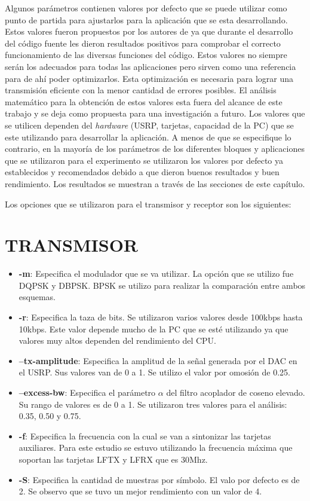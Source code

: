 Algunos par\'ametros contienen valores por defecto que se puede utilizar como punto de partida para ajustarlos para la
aplicaci\'on que se esta desarrollando. Estos valores fueron propuestos por los autores de \gnuradio ya que durante el desarrollo
del c\'odigo fuente les dieron resultados positivos para comprobar el correcto funcionamiento de las diversas funciones del
c\'odigo. Estos valores no siempre ser\'an los adecuados para todas las aplicaciones pero sirven como una referencia para de ah\'i
poder optimizarlos. Esta optimizaci\'on es necesaria para lograr una transmisi\'on eficiente con la menor cantidad de errores
posibles. El an\'alisis matem\'atico para la obtenci\'on de estos valores esta fuera del alcance de este trabajo y se deja como
propuesta para una investigaci\'on a futuro. Los valores que se utilicen dependen del \emph{hardware} (USRP, tarjetas, capacidad
de la PC) que se este utilizando para desarrollar la aplicaci\'on. A menos de que se especifique lo contrario, en la mayor\'ia de
los par\'ametros de los diferentes bloques y aplicaciones que se utilizaron para el experimento se utilizaron los valores por
defecto ya establecidos y recomendados debido a que dieron buenos resultados y buen rendimiento. Los resultados se muestran a
trav\'es de las secciones de este cap\'itulo.

Los opciones que se utilizaron para el transmisor y receptor son los siguientes:

\section*{TRANSMISOR}
\begin{itemize}
  \item \textbf{-m}: Especifica el modulador que se va utilizar. La opci\'on que se utilizo fue
  DQPSK y DBPSK. BPSK se utilizo para realizar la comparaci\'on entre ambos esquemas.
  \item \textbf{-r}: Especifica la taza de bits. Se utilizaron varios valores desde 100kbps hasta
  10kbps. Este valor depende mucho de la PC que se est\'e utilizando ya que valores muy altos
  dependen del rendimiento del CPU.
  \item \textbf{--tx-amplitude}: Especifica la amplitud de la se\~nal generada por el DAC en el
  USRP. Sus valores van de 0 a 1. Se utilizo el valor por omosi\'on de 0.25.
  \item \textbf{--excess-bw}: Especifica el par\'ametro $\alpha$ del filtro acoplador de coseno
  elevado. Su rango de valores es de 0 a 1. Se utilizaron tres valores para el an\'alisis: 0.35,
  0.50 y 0.75.
  \item \textbf{-f}: Especifica la frecuencia con la cual se van a sintonizar las tarjetas
  auxiliares. Para este estudio se estuvo utilizando la frecuencia m\'axima que soportan las
  tarjetas LFTX y LFRX que es 30Mhz.
  \item \textbf{-S}: Especifica la cantidad de muestras por s\'imbolo. El valo por defecto es de 2. Se
  observo que se tuvo un mejor rendimiento con un valor de 4.
\end{itemize}

